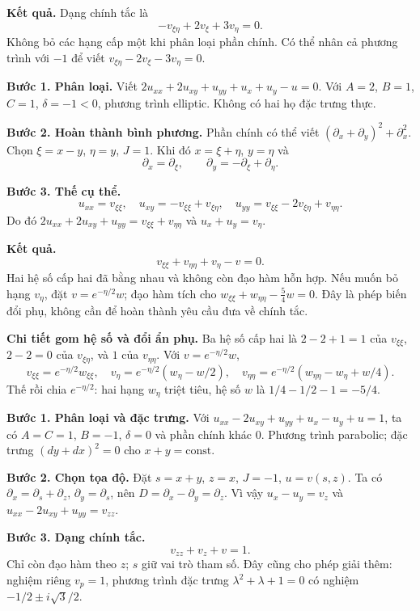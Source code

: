 \textbf{Kết quả.} Dạng chính tắc là
\[\boxed{-v_{\xi\eta}+2v_\xi+3v_\eta=0.}\]
Không bỏ các hạng cấp một khi phân loại phần chính. Có thể nhân cả phương trình với $-1$ để viết $v_{\xi\eta}-2v_\xi-3v_\eta=0$.

\textbf{Bước 1. Phân loại.} Viết $2u_{xx}+2u_{xy}+u_{yy}+u_x+u_y-u=0$. Với $A=2$, $B=1$, $C=1$, $\delta=-1<0$, phương trình elliptic. Không có hai họ đặc trưng thực.

\textbf{Bước 2. Hoàn thành bình phương.} Phần chính có thể viết $(\partial_x+\partial_y)^2+\partial_x^2$. Chọn $\xi=x-y$, $\eta=y$, $J=1$. Khi đó $x=\xi+\eta$, $y=\eta$ và
\[\partial_x=\partial_\xi,\qquad\partial_y=-\partial_\xi+\partial_\eta.\]

\textbf{Bước 3. Thế cụ thể.}
\[u_{xx}=v_{\xi\xi},\quad u_{xy}=-v_{\xi\xi}+v_{\xi\eta},\quad
u_{yy}=v_{\xi\xi}-2v_{\xi\eta}+v_{\eta\eta}.\]
Do đó $2u_{xx}+2u_{xy}+u_{yy}=v_{\xi\xi}+v_{\eta\eta}$ và $u_x+u_y=v_\eta$.

\textbf{Kết quả.}
\[\boxed{v_{\xi\xi}+v_{\eta\eta}+v_\eta-v=0.}\]
Hai hệ số cấp hai đã bằng nhau và không còn đạo hàm hỗn hợp. Nếu muốn bỏ hạng $v_\eta$, đặt $v=e^{-\eta/2}w$; đạo hàm tích cho $w_{\xi\xi}+w_{\eta\eta}-\tfrac54w=0$. Đây là phép biến đổi phụ, không cần để hoàn thành yêu cầu đưa về chính tắc.

\textbf{Chi tiết gom hệ số và đổi ẩn phụ.} Ba hệ số cấp hai là $2-2+1=1$ của $v_{\xi\xi}$, $2-2=0$ của $v_{\xi\eta}$, và $1$ của $v_{\eta\eta}$. Với $v=e^{-\eta/2}w$,
\[v_{\xi\xi}=e^{-\eta/2}w_{\xi\xi},\quad v_\eta=e^{-\eta/2}(w_\eta-w/2),\quad
v_{\eta\eta}=e^{-\eta/2}(w_{\eta\eta}-w_\eta+w/4).\]
Thế rồi chia $e^{-\eta/2}$: hai hạng $w_\eta$ triệt tiêu, hệ số $w$ là $1/4-1/2-1=-5/4$.

\textbf{Bước 1. Phân loại và đặc trưng.} Với $u_{xx}-2u_{xy}+u_{yy}+u_x-u_y+u=1$, ta có $A=C=1$, $B=-1$, $\delta=0$ và phần chính khác $0$. Phương trình parabolic; đặc trưng $(dy+dx)^2=0$ cho $x+y=\mathrm{const}$.

\textbf{Bước 2. Chọn tọa độ.} Đặt $s=x+y$, $z=x$, $J=-1$, $u=v(s,z)$. Ta có $\partial_x=\partial_s+\partial_z$, $\partial_y=\partial_s$, nên $D=\partial_x-\partial_y=\partial_z$. Vì vậy $u_x-u_y=v_z$ và $u_{xx}-2u_{xy}+u_{yy}=v_{zz}$.

\textbf{Bước 3. Dạng chính tắc.}
\[\boxed{v_{zz}+v_z+v=1.}\]
Chỉ còn đạo hàm theo $z$; $s$ giữ vai trò tham số. Đây cũng cho phép giải thêm: nghiệm riêng $v_p=1$, phương trình đặc trưng $\lambda^2+\lambda+1=0$ có nghiệm $-1/2\pm i\sqrt3/2$.

